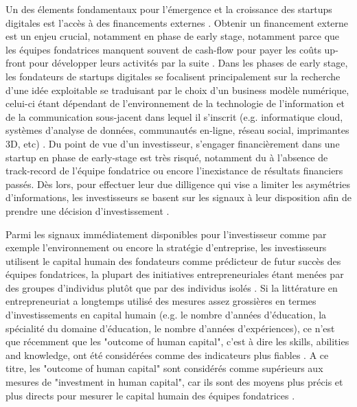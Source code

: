 \documentclass[11pt]{article}
\begin{document}
Un des élements fondamentaux pour l'émergence et la croissance des startups digitales est l'accès à des financements externes \citep{klein2020start}. Obtenir un financement externe est un enjeu crucial, notamment en phase de early stage, notamment parce que les équipes fondatrices manquent souvent de cash-flow pour payer les coûts up-front pour développer leurs activités par la suite \citep{ratzinger2018impact}. Dans les phases de early stage, les fondateurs de startups digitales se focalisent principalement sur la recherche d'une idée exploitable se traduisant par le choix d'un business modèle numérique, celui-ci étant dépendant de l'environnement de la technologie de l’information et de la communication sous-jacent dans lequel il s'inscrit (e.g. informatique cloud, systèmes d’analyse de données, communautés en-ligne, réseau social, imprimantes 3D, etc) \citep{nambisan2017digital}. Du point de vue d'un investisseur, s'engager financièrement dans une startup en phase de early-stage est très risqué, notamment du à l'absence de track-record de l'équipe fondatrice ou encore l'inexistance de résultats financiers passés. Dès lors, pour effectuer leur due dilligence qui vise a limiter les asymétries d'informations, les investisseurs se basent sur les signaux à leur disposition afin de prendre une décision d'investissement \citep{colombo2021use, ko2018signaling, spence1974market}.

Parmi les signaux immédiatement disponibles pour l'investisseur comme par exemple l'environnement ou encore la stratégie d'entreprise, les investisseurs utilisent le capital humain des fondateurs comme prédicteur de futur succès des équipes fondatrices, la plupart des initiatives entrepreneuriales étant menées par des groupes d'individus plutôt que par des individus isolés \citep{roure1990predictors, klotz2014new}. Si la littérature en entrepreneuriat a longtemps utilisé des mesures assez grossières en termes d'investissements en capital humain (e.g. le nombre d'années d'éducation, la spécialité du domaine d'éducation, le nombre d'années d'expériences), ce n'est que récemment que les "outcome of human capital", c'est à dire les skills, abilities and knowledge, ont été considérées comme des indicateurs plus fiables \citep{unger2011human, marvel2016human}. A ce titre, les "outcome of human capital" sont considérés comme supérieurs aux mesures de "investment in human capital", car ils sont des moyens plus précis et plus directs pour mesurer le capital humain des équipes fondatrices \citep{unger2011human}.
\end{document}
